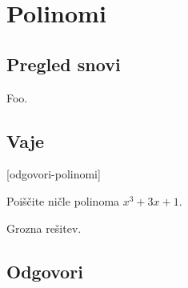 \chapter{Polinomi}
\label{cha:polinomi}

\section{Pregled snovi}
\label{sec:polinomi-pregled-snovi}

Foo.

\section{Vaje}
\label{sec:polinomi-funkcije-vaje}


[odgovori-polinomi]

\begin{vaja}
  Poiščite ničle polinoma $x^3 + 3 x + 1$.

  \begin{odgovor}
    Grozna rešitev.
  \end{odgovor}
\end{vaja}



\section{Odgovori}
\label{sec:polinomi-odgovori}




